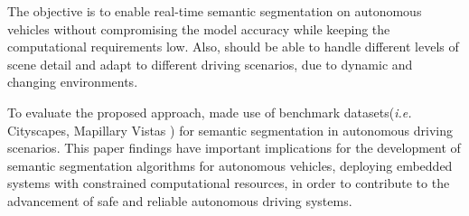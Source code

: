   The objective is to enable real-time semantic segmentation on autonomous vehicles without
  compromising the model accuracy while keeping the computational requirements low. Also,
  should be able to handle different levels of scene detail and adapt to different driving
  scenarios, due to dynamic and changing environments.


  To evaluate the proposed approach, made use of benchmark datasets(\emph{i.e.}
  Cityscapes\cite{cordts2016cityscapes}, Mapillary Vistas \cite{neuhold2017mapillary}) for semantic
  segmentation in autonomous driving scenarios. This paper findings have important implications for
  the development of  semantic segmentation algorithms for autonomous vehicles,
  deploying embedded systems with constrained computational resources, in order
  to contribute to the advancement of safe and reliable autonomous driving systems.
